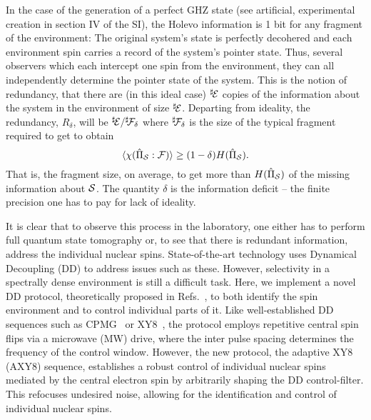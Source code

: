 \documentclass[aps,prl,floatfix,twocolumn,footinbib,superscriptaddress]{revtex4-1}
\begin{document}
In the case of the generation of a perfect GHZ state (see artificial, experimental creation in section \RN{4} of the SI), the Holevo information is 1 bit for any fragment of the environment: The original system's state is perfectly decohered and each environment spin carries a record of the system's pointer state. Thus, several observers which each intercept one spin from the environment, they can all independently determine the pointer state of the system. This is the notion of redundancy, that there are (in this ideal case) $\Es$ copies of the information about the system in the environment of size $\Es$. Departing from ideality, the redundancy, $R_\delta$, will be $\Es/\Fd$ where $\Fd$ is the size of the typical fragment required to get to obtain
\begin{equation} \label{eq:Red}
\avg{\HolpIL} \ge (1-\delta) \HPB .
\end{equation}
That is, the fragment size, on average, to get more than $\HPB$ of the missing information about $\S$. The quantity $\delta$ is the information deficit -- the finite precision one has to pay for lack of ideality. 


It is clear that to observe this process in the laboratory, one either has to perform full quantum state tomography or, to see that there is redundant information, address the individual nuclear spins. State-of-the-art technology uses Dynamical Decoupling (DD) to address issues such as these. However, selectivity in a spectrally dense environment is still a difficult task. Here, we implement a novel DD protocol, theoretically proposed in Refs.~\cite{Cas2015,Cas17}, to both identify the spin environment and to control individual parts of it. Like well-established DD sequences such as CPMG~\cite{MAUDSLEY1986488} or XY8~\cite{gull90}, the protocol employs repetitive central spin flips via a microwave (MW) drive, where the inter pulse spacing determines the frequency of the control window. However, the new protocol, the adaptive XY8 (AXY8) sequence, establishes a robust control of individual nuclear spins mediated by the central electron spin by arbitrarily shaping the DD control-filter. This refocuses undesired noise, allowing for the identification and control of individual nuclear spins. 
\end{document}
